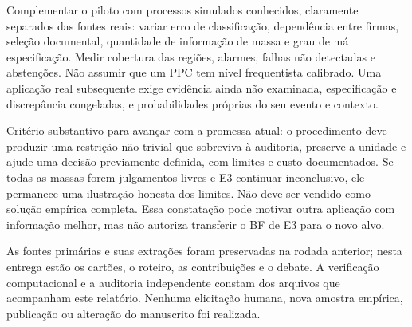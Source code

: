 \documentclass[
  brazilian,
  11pt,
  a4paper,
]{article}
\begin{document}
Complementar o piloto com processos simulados conhecidos, claramente
separados das fontes reais: variar erro de classificação, dependência
entre firmas, seleção documental, quantidade de informação de massa e
grau de má especificação. Medir cobertura das regiões, alarmes, falhas
não detectadas e abstenções. Não assumir que um PPC tem nível
frequentista calibrado. Uma aplicação real subsequente exige evidência
ainda não examinada, especificação e discrepância congeladas, e
probabilidades próprias do seu evento e contexto.

Critério substantivo para avançar com a promessa atual: o procedimento
deve produzir uma restrição não trivial que sobreviva à auditoria,
preserve a unidade e ajude uma decisão previamente definida, com limites
e custo documentados. Se todas as massas forem julgamentos livres e E3
continuar inconclusivo, ele permanece uma ilustração honesta dos
limites. Não deve ser vendido como solução empírica completa. Essa
constatação pode motivar outra aplicação com informação melhor, mas não
autoriza transferir o BF de E3 para o novo alvo.

As fontes primárias e suas extrações foram preservadas na rodada
anterior; nesta entrega estão os cartões, o roteiro, as contribuições e
o debate. A verificação computacional e a auditoria independente constam
dos arquivos que acompanham este relatório. Nenhuma elicitação humana,
nova amostra empírica, publicação ou alteração do manuscrito foi
realizada.
\end{document}
